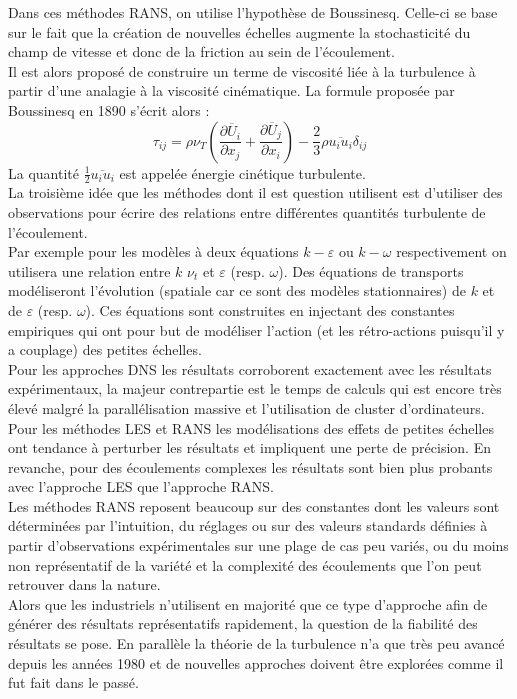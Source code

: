 \documentclass[a4paper,12pt]{article}
\newcommand{\bepar}[1]{
	\left( #1 \right)  
}
\newcommand{\keps}{$k-\varepsilon$}
\numberwithin{equation}{section} %
\begin{document}
  \noindent Dans ces méthodes RANS, on utilise l'hypothèse de Boussinesq. Celle-ci se base sur le fait que la création de nouvelles échelles augmente la stochasticité du champ de vitesse et donc de la friction au sein de l'écoulement.\\
  Il est alors proposé de construire un terme de viscosité liée à la turbulence à partir d'une analagie à la viscosité cinématique. La formule proposée par Boussinesq en 1890 s'écrit alors : 
\begin{equation}
\tau_{ij} = \rho \nu_T\bepar{\frac{\partial \overline{U}_i}{\partial x_j} + \frac{\partial \overline{U}_j}{\partial x_i}} - \frac{2}{3} \rho \overline{u_iu_i} \delta_{ij} \label{boussi}
\end{equation} 
   La quantité $\frac{1}{2}\overline{u_iu_i} $ est appelée énergie cinétique turbulente.\\La troisième idée que les méthodes dont il est question utilisent est d'utiliser des observations pour écrire des relations entre différentes quantités turbulente de l'écoulement. \\
Par exemple pour les modèles à deux équations \keps $ $ ou $k-\omega$ respectivement on utilisera une relation entre $k$ $\nu_t$ et $\varepsilon$ (resp. $\omega$). Des équations de transports modéliseront l'évolution (spatiale car ce sont des modèles stationnaires) de $k$ et de $\varepsilon$ (resp. $\omega$). Ces équations sont construites en injectant des constantes empiriques qui ont pour but de modéliser l'action (et les rétro-actions puisqu'il y a couplage) des petites échelles.\\

Pour les approches DNS les résultats corroborent exactement avec les résultats expérimentaux, la majeur contrepartie est le temps de calculs qui est encore très élevé malgré la parallélisation massive et l'utilisation de cluster d'ordinateurs. \\
Pour les méthodes LES et RANS les modélisations des effets de petites échelles ont tendance à perturber les résultats et impliquent une perte de précision. En revanche, pour des écoulements complexes les résultats sont bien plus probants avec l'approche LES que l'approche RANS.\\
Les méthodes RANS reposent beaucoup sur des constantes dont les valeurs sont déterminées par l'intuition, du réglages ou sur des valeurs standards définies à partir d'observations expérimentales sur une plage de cas peu variés, ou du moins non représentatif de la variété et la complexité des écoulements que l'on peut retrouver dans la nature.\\
Alors que les industriels n'utilisent en majorité que ce type d'approche afin de générer des résultats représentatifs rapidement, la question de la fiabilité des résultats se pose. En parallèle la théorie de la turbulence n'a que très peu avancé depuis les années 1980 et de nouvelles approches doivent être explorées comme il fut fait dans le passé.\\[2mm]
\end{document}
